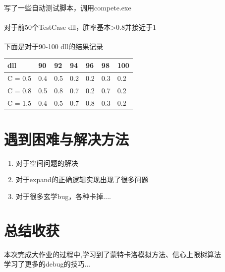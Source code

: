 \documentclass[]{article}
\begin{document}
\paragraph{} 写了一些自动测试脚本，调用compete.exe 
\paragraph{} 对于前50个TestCase dll，胜率基本>0.8并接近于1\\
\paragraph{} 下面是对于90-100 dll的结果记录

\begin{center}
    \begin{tabular}{lllllll}
    \hline
    dll & 90 & 92 & 94 & 96 &98 & 100   \\ \hline
     C = 0.5 & 0.4& 0.5& 0.2 & 0.2  & 0.3                              & 0.2   \\ \hline 
     C = 0.8 & 0.5& 0.8& 0.7 & 0.2  & 0.7                              & 0.2   \\ \hline
     C = 1.5 & 0.4& 0.5& 0.7 & 0.8  & 0.3                              & 0.2   \\ \hline
    \end{tabular}
\end{center}

\section{遇到困难与解决方法}
\begin{enumerate}
    \item 对于空间问题的解决
    \item 对于expand的正确逻辑实现出现了很多问题
    \item 对于很多玄学bug，各种卡掉....
\end{enumerate}

\section{总结收获}
本次完成大作业的过程中,学习到了蒙特卡洛模拟方法、信心上限树算法\\
学习了更多的debug的技巧...
\end{document}
